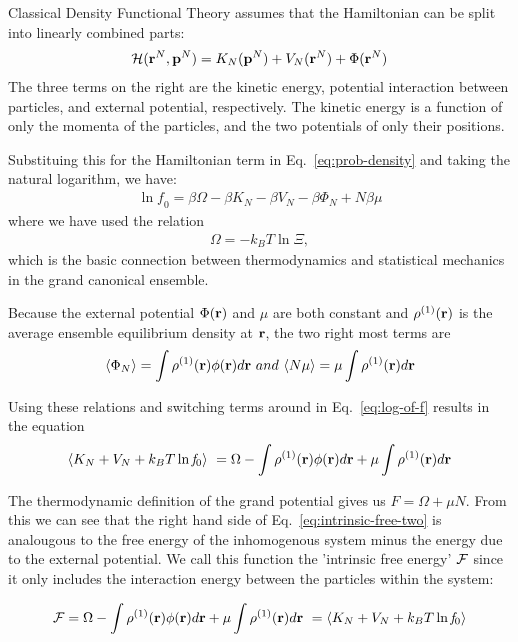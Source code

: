Classical Density Functional Theory assumes that the Hamiltonian can
be split into linearly combined parts:
\begin{align}\label{eq:hamiltonian}
  \mathcal{H}(\textbf{r}^N,\mathbf{p}^N) = K_N(\mathbf{p}^N) + V_N(\textbf{r}^N) + \Phi(\textbf{r}^N)
\end{align}
The three terms on the right are the kinetic energy, potential
interaction between particles, and external potential, respectively.
The kinetic energy is a function of only the momenta of the particles,
and the two potentials of only their positions.

Substituing this for the Hamiltonian term in Eq.~\ref{eq:prob-density}
and taking the natural logarithm, we have:
\begin{align}
  \label{eq:log-of-f}
  \ln \mathit{f}_0 = \beta\Omega - \beta K_N - \beta V_N - \beta \Phi_N + N\beta \mu
\end{align}
where we have used the relation
\begin{align}
  \Omega = -k_BT\ln\Xi,
\end{align}
which is the basic connection between thermodynamics and statistical
mechanics in the grand canonical ensemble.

Because the external potential $\Phi(\textbf{r})$ and $\mu$ are both constant
and $\rho^{(1)}(\textbf{r})$ is the average ensemble equilibrium density at
$\textbf{r}$, the two right most terms are
\begin{align}
  \langle \Phi_N \rangle = \int \rho^{(1)}(\textbf{r})\phi(\textbf{r})d\textbf{r} \
  and \
  \langle N\mu \rangle = \mu \int \rho^{(1)}(\textbf{r}) d\textbf{r}
\end{align}

Using these relations and switching terms around in
Eq.~\ref{eq:log-of-f} results in the equation
\begin{align} \label{eq:intrinsic-free-two}
  \langle K_N + V_N + k_BT \ln \mathit{f}_0 \rangle \
  = \Omega - \int \rho^{(1)}(\textbf{r})\phi(\textbf{r})d\textbf{r} + \mu \int \rho^{(1)}(\textbf{r})d\textbf{r}
\end{align}

The thermodynamic definition of the grand potential gives us $F =
\Omega + \mu N$.  From this we can see that the right hand side of
Eq.~\ref{eq:intrinsic-free-two} is analougous to the free energy of
the inhomogenous system minus the energy due to the external
potential.  We call this function the 'intrinsic free energy' $\mathcal{F}$
since it only includes the interaction energy between the particles
within the system:

\begin{align}
  \label{eq:intrinsic-free-three}
  \mathcal{F} = \Omega - \int \rho^{(1)}(\textbf{r})\phi(\textbf{r})d\textbf{r} + \mu \int \rho^{(1)}(\textbf{r})d\textbf{r} \
  = \langle K_N + V_N + k_BT \ln \mathit{f}_0 \rangle
\end{align}

